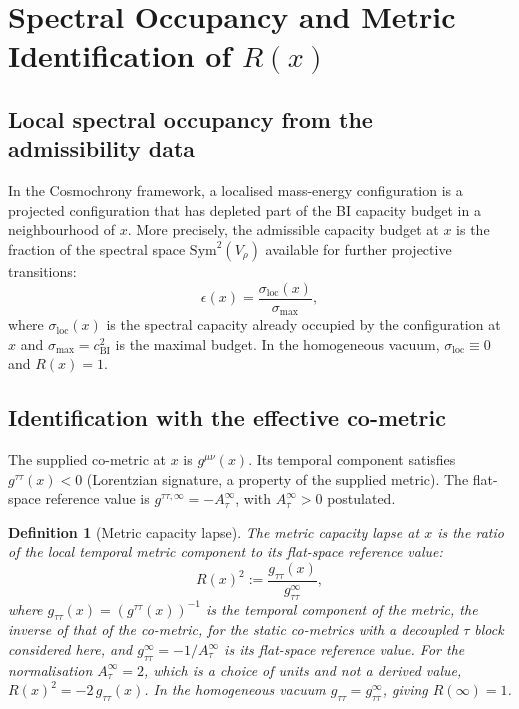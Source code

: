 \documentclass[11pt,a4paper]{article}
\newtheorem{definition}[theorem]{Definition}
\begin{document}
  \section{Spectral Occupancy and Metric Identification of $R(x)$}\label{sec:spectral}

  \subsection{Local spectral occupancy from the admissibility data}

    In the Cosmochrony framework, a localised mass-energy configuration is a projected
    configuration that has depleted part of the BI capacity budget in a neighbourhood
    of $x$.
    More precisely, the admissible capacity budget at $x$ is the fraction of the spectral
    space $\mathrm{Sym}^2(V_\rho)$ available for further projective transitions:
    \begin{equation}\label{eq:epsilon}
      \epsilon(x) = \frac{\sigma_{\mathrm{loc}}(x)}{\sigma_{\max}},
    \end{equation}
    where $\sigma_{\mathrm{loc}}(x)$ is the spectral capacity already occupied by the
    configuration at~$x$ and $\sigma_{\max} = c_{\mathrm{BI}}^2$ is the maximal budget.
    In the homogeneous vacuum, $\sigma_{\mathrm{loc}} \equiv 0$ and $R(x) = 1$.

  \subsection{Identification with the effective co-metric}

    The supplied co-metric at $x$ is $g^{\mu\nu}(x)$.
    Its temporal component satisfies $g^{\tau\tau}(x) < 0$ (Lorentzian signature, a property of the supplied
    metric).
    The flat-space reference value is $g^{\tau\tau,\infty} = -A_\tau^\infty$, with $A_\tau^\infty > 0$ postulated.

    \begin{definition}[Metric capacity lapse]\label{def:lapse}
      The \emph{metric capacity lapse} at $x$ is the ratio of the local temporal metric
      component to its flat-space reference value:
      \begin{equation}\label{eq:lapse}
        R(x)^2 := \frac{g_{\tau\tau}(x)}{g_{\tau\tau}^\infty},
      \end{equation}
      where $g_{\tau\tau}(x) = (g^{\tau\tau}(x))^{-1}$ is the temporal component of the metric, the inverse of that
      of the co-metric, for the static co-metrics with a decoupled $\tau$ block considered here, and
      $g_{\tau\tau}^\infty = -1/A_\tau^\infty$ is its flat-space reference value.
      For the normalisation $A_\tau^\infty = 2$, which is a choice of units and not a derived value,
      $R(x)^2 = -2\,g_{\tau\tau}(x)$.
      In the homogeneous vacuum $g_{\tau\tau} = g_{\tau\tau}^\infty$, giving $R(\infty) = 1$.
    \end{definition}
\end{document}
